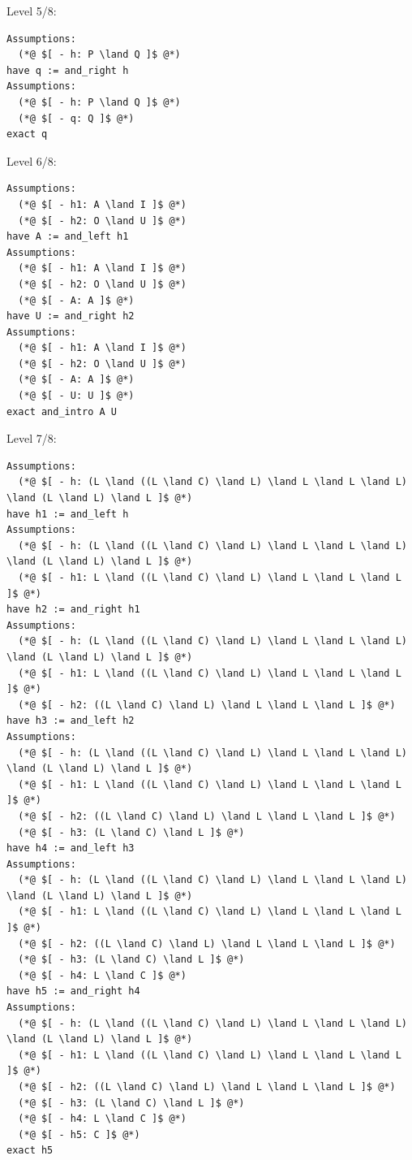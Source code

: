 \documentclass{article}
\theoremstyle{theorem}
\theoremstyle{definition}
\theoremstyle{remark}
\begin{document}
Level 5/8:
\begin{lstlisting}
Assumptions:
  (*@ $[ - h: P \land Q ]$ @*)
have q := and_right h
Assumptions:
  (*@ $[ - h: P \land Q ]$ @*)
  (*@ $[ - q: Q ]$ @*)
exact q
\end{lstlisting}

Level 6/8:
\begin{lstlisting}
Assumptions:
  (*@ $[ - h1: A \land I ]$ @*)
  (*@ $[ - h2: O \land U ]$ @*)
have A := and_left h1
Assumptions:
  (*@ $[ - h1: A \land I ]$ @*)
  (*@ $[ - h2: O \land U ]$ @*)
  (*@ $[ - A: A ]$ @*)
have U := and_right h2
Assumptions:
  (*@ $[ - h1: A \land I ]$ @*)
  (*@ $[ - h2: O \land U ]$ @*)
  (*@ $[ - A: A ]$ @*)
  (*@ $[ - U: U ]$ @*)
exact and_intro A U
\end{lstlisting}

Level 7/8:
\begin{lstlisting}
Assumptions:
  (*@ $[ - h: (L \land ((L \land C) \land L) \land L \land L \land L) \land (L \land L) \land L ]$ @*)
have h1 := and_left h
Assumptions:
  (*@ $[ - h: (L \land ((L \land C) \land L) \land L \land L \land L) \land (L \land L) \land L ]$ @*)
  (*@ $[ - h1: L \land ((L \land C) \land L) \land L \land L \land L ]$ @*)
have h2 := and_right h1
Assumptions:
  (*@ $[ - h: (L \land ((L \land C) \land L) \land L \land L \land L) \land (L \land L) \land L ]$ @*)
  (*@ $[ - h1: L \land ((L \land C) \land L) \land L \land L \land L ]$ @*)
  (*@ $[ - h2: ((L \land C) \land L) \land L \land L \land L ]$ @*)
have h3 := and_left h2
Assumptions:
  (*@ $[ - h: (L \land ((L \land C) \land L) \land L \land L \land L) \land (L \land L) \land L ]$ @*)
  (*@ $[ - h1: L \land ((L \land C) \land L) \land L \land L \land L ]$ @*)
  (*@ $[ - h2: ((L \land C) \land L) \land L \land L \land L ]$ @*)
  (*@ $[ - h3: (L \land C) \land L ]$ @*)
have h4 := and_left h3
Assumptions:
  (*@ $[ - h: (L \land ((L \land C) \land L) \land L \land L \land L) \land (L \land L) \land L ]$ @*)
  (*@ $[ - h1: L \land ((L \land C) \land L) \land L \land L \land L ]$ @*)
  (*@ $[ - h2: ((L \land C) \land L) \land L \land L \land L ]$ @*)
  (*@ $[ - h3: (L \land C) \land L ]$ @*)
  (*@ $[ - h4: L \land C ]$ @*)
have h5 := and_right h4
Assumptions:
  (*@ $[ - h: (L \land ((L \land C) \land L) \land L \land L \land L) \land (L \land L) \land L ]$ @*)
  (*@ $[ - h1: L \land ((L \land C) \land L) \land L \land L \land L ]$ @*)
  (*@ $[ - h2: ((L \land C) \land L) \land L \land L \land L ]$ @*)
  (*@ $[ - h3: (L \land C) \land L ]$ @*)
  (*@ $[ - h4: L \land C ]$ @*)
  (*@ $[ - h5: C ]$ @*)
exact h5
\end{lstlisting}
\end{document}
